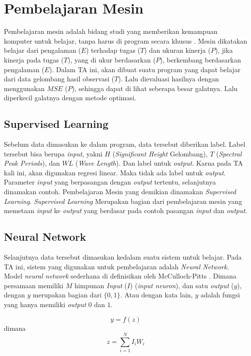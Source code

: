 \section{Pembelajaran Mesin}
    Pembelajaran mesin adalah bidang studi yang memberikan kemampuan komputer untuk belajar, tanpa harus di program secara khusus \cite{arthur_l_samuel_1959}. Mesin dikatakan belajar dari pengalaman ($E$) terhadap tugas ($T$) dan ukuran kinerja ($P$), jika kinerja pada tugas ($T$), yang di ukur berdasarkan ($P$), berkembang berdasarkan pengalaman ($E$). Dalam TA ini, akan dibuat suatu program yang dapat belajar dari data gelombang hasil observasi ($T$). Lalu dievaluasi hasilnya dengan menggunakan $MSE$ ($P$), sehingga dapat di lihat seberapa besar galatnya. Lalu diperkecil galatnya dengan metode optimasi.

\subsection{Supervised Learning}
    Sebelum data dimasukan ke dalam program, data tersebut diberikan label. Label tersebut bisa berupa \emph{input}, yakni $H$ (\emph{Significant Height} Gelombang), $T$ (\emph{Spectral Peak Periods}), dan $WL$ (\emph{Wave Length}). Dan label untuk \emph{output}. Karna pada TA kali ini, akan digunakan regresi linear. Maka tidak ada label untuk \emph{output}. Parameter \emph{input} yang berpasangan dengan \emph{output} tertentu, selanjutnya dinamakan contoh. Pembelajaran Mesin yang demikian dinamakan \emph{Supervised Learning}. \emph{Supervised Learning} Merupakan bagian dari pembelajaran mesin yang memetaan \emph{input} ke \emph{output} yang berdasar pada contoh pasangan \emph{input} dan \emph{output}\cite{AIPeterNorvig}. 

\subsection{Neural Network}
    Selanjutnya data tersebut dimasukan kedalam suatu sistem untuk belajar. Pada TA ini, sistem yang digunakan untuk pembelajaran adalah \emph{Neural Network}.
    Model \emph{neural network} sederhana di definisikan oleh McCulloch-Pitts \cite{McCulloch1943}. Dimana persamaan memiliki $M$ himpunan \emph{Input} ($I$) (\emph{input neuron}), dan satu \emph{output} ($y$), dengan $y$ merupakan bagian dari $\{0,1\}$. Atau dengan kata lain, $y$ adalah fungsi yang hanya memiliki \emph{output} $0$ dan $1$.

    \begin{equation}
        y = f(z)
    \end{equation}
    dimana
    \begin{equation}
    \label{eq:mcullochNeuralNetwork}
        z = \sum_{i=1}^N I_iW_i
    \end{equation}

